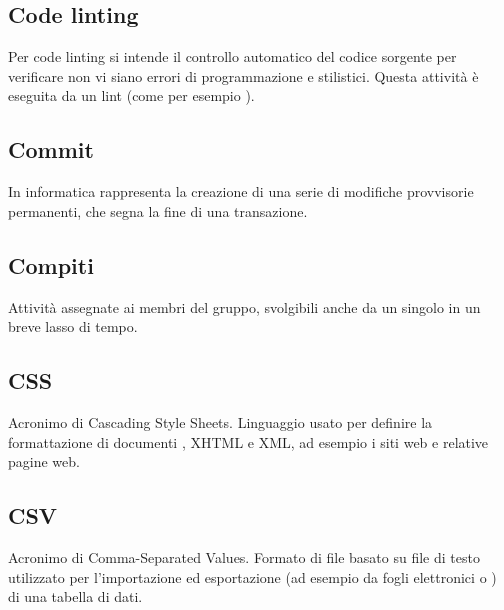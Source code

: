 \subsection*{Code linting}
Per code linting si intende il controllo automatico del codice sorgente per verificare non vi siano errori di programmazione e stilistici. Questa attività è eseguita da un lint (come per esempio ).

\subsection*{Commit}
In informatica rappresenta la creazione di una serie di modifiche provvisorie permanenti, che segna la fine di una transazione.

\subsection*{Compiti}
Attività assegnate ai membri del gruppo, svolgibili anche da un singolo in un breve lasso di tempo.

\subsection*{CSS}
Acronimo di Cascading Style Sheets. Linguaggio usato per definire la formattazione di documenti , XHTML e XML, ad esempio i siti web e relative pagine web.

\subsection*{CSV}
Acronimo di Comma-Separated Values. Formato di file basato su file di testo utilizzato per l'importazione ed esportazione (ad esempio da fogli elettronici o ) di una tabella di dati. 




